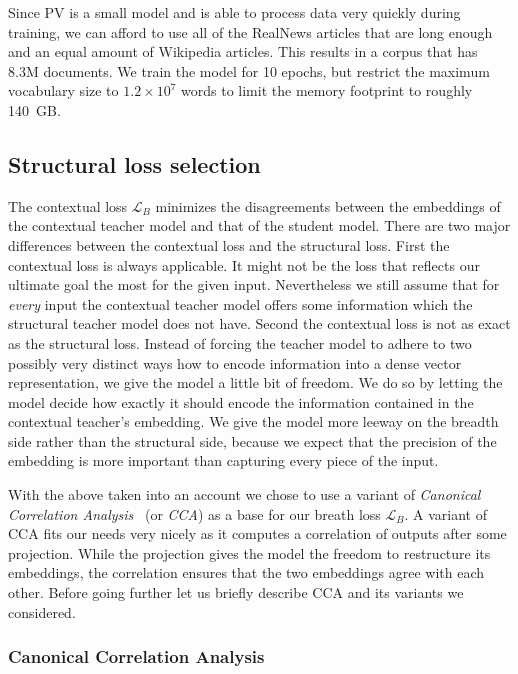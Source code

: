 Since PV is a small model and is able to process data very quickly during
training, we can afford to use all of the RealNews articles that are long enough
and an equal amount of Wikipedia articles. This results in a corpus that has
8.3M documents. We train the model for 10 epochs, but restrict the maximum
  vocabulary size to $1.2{\times}10^7$ words to limit the memory footprint to
  roughly 140~GB.

\subsection{Structural loss selection}

The contextual loss $\mathcal{L}_B$ minimizes the disagreements between the
embeddings of the contextual teacher model  and that of the student model.
There are two major differences between the contextual loss and the structural
loss. First the contextual loss is always applicable. It might not be the loss
that reflects our ultimate goal the most for the given input. Nevertheless we
still assume that for \emph{every} input the contextual teacher model offers
some information which the structural teacher model does not have. Second the
contextual loss is not as exact as the structural loss. Instead of forcing the
teacher model to adhere to two possibly very distinct ways how to encode
information into a dense vector representation, we give the model a little bit
of freedom. We do so by letting the model decide how exactly it should encode
the information contained in the contextual teacher's embedding. We give the
model more leeway on the breadth side rather than the structural side, because
we expect that the precision of the embedding is more important than capturing
every piece of the input.

With the above taken into an account we chose to use a variant of
\emph{Canonical Correlation Analysis}~\cite{hotelling1992relations} (or
\emph{CCA}) as a base for our breath loss $\mathcal{L}_B$. A variant of CCA fits
our needs very nicely as it computes a correlation of outputs after some
projection. While the projection gives the model the freedom to restructure its
embeddings, the correlation ensures that the two embeddings agree with each
other. Before going further let us briefly describe CCA and its variants we
considered.

\subsubsection{Canonical Correlation Analysis}

